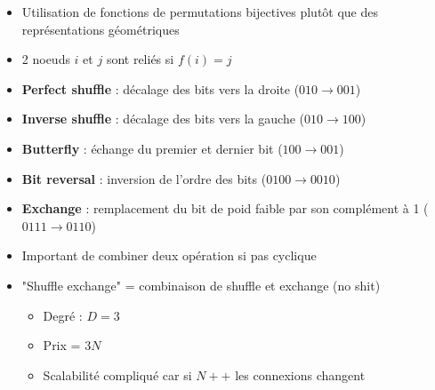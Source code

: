 \documentclass[12pt,a4paper,oneside, titlepage]{article}
\begin{document}
      \begin{itemize}
        \item Utilisation de fonctions de permutations bijectives plutôt que des représentations géométriques
        \item 2 noeuds $i$ et $j$ sont reliés si $f(i)=j$
        \item \textbf{Perfect shuffle} : décalage des bits vers la droite ($010 \rightarrow 001$)
        \item \textbf{Inverse shuffle} : décalage des bits vers la gauche ($010 \rightarrow 100$)
        \item \textbf{Butterfly} : échange du premier et dernier bit ($100 \rightarrow 001$)
        \item \textbf{Bit reversal} : inversion de l'ordre des bits ($0100 \rightarrow 0010$)
        \item \textbf{Exchange} : remplacement du bit de poid faible par son complément à 1 ($0111 \rightarrow 0110$)
        \item Important de combiner deux opération si pas cyclique
        \item "Shuffle exchange" = combinaison de shuffle et exchange (no shit)
        \begin{itemize}
          \item Degré : $D = 3$
          \item Prix = $3N$
          \item Scalabilité compliqué car si $N++$ les connexions changent

        \end{itemize}
      \end{itemize}
\end{document}
